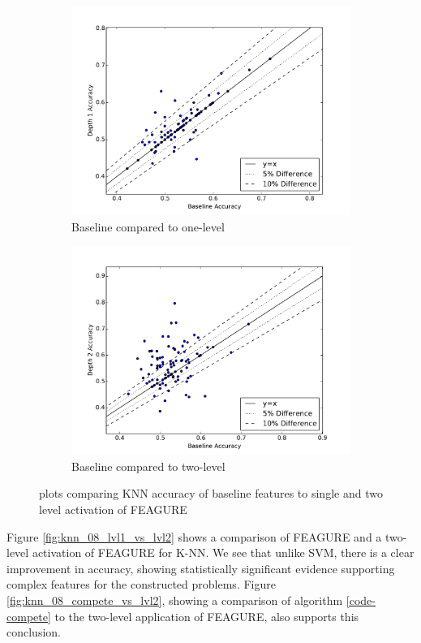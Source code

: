 \documentclass[twoside,11pt]{article}
\theoremstyle{definition}
\begin{document}
\begin{figure}
	\begin{subfigure}{.5\textwidth}
		\centering
		\includegraphics[width=.9\linewidth]{knn_08_base_vs_lvl1.pdf}
		\caption{Baseline compared to one-level}
		\label{fig:knn_base_vs_lvl1}
	\end{subfigure}%
	\begin{subfigure}{.5\textwidth}
		\centering
		\includegraphics[width=.9\linewidth]{knn_08_base_vs_lvl2.pdf}
		\caption{Baseline compared to two-level}
		\label{fig:knn_base_vs_lvl2}
	\end{subfigure}
	\caption{plots comparing KNN accuracy of baseline features to single and two level activation of FEAGURE}
	\label{fig:knn_base}
\end{figure}

Figure \ref{fig:knn_08_lvl1_vs_lvl2} shows a comparison of FEAGURE and a two-level activation of FEAGURE for K-NN. We see that unlike SVM, there is a clear improvement in accuracy, showing statistically significant evidence supporting complex features for the constructed problems. Figure \ref{fig:knn_08_compete_vs_lvl2}, showing a comparison of algorithm \ref{code-compete} to the two-level application of FEAGURE, also supports this conclusion.
\end{document}
